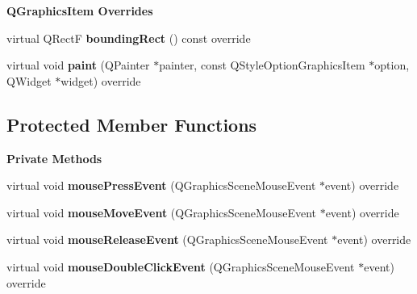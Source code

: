 \begin{Indent}\textbf{ Q\+Graphics\+Item Overrides}\par
\begin{DoxyCompactItemize}
\item 
\mbox{\label{classrev_1_1_view_1_1_timeline_track_abbdcd942dac9cec5897f6cd816451ede}} 
virtual Q\+RectF {\bfseries bounding\+Rect} () const override
\item 
\mbox{\label{classrev_1_1_view_1_1_timeline_track_a713dfe8e7dcf771a002fe1fbb7d7c5e9}} 
virtual void {\bfseries paint} (Q\+Painter $\ast$painter, const Q\+Style\+Option\+Graphics\+Item $\ast$option, Q\+Widget $\ast$widget) override
\end{DoxyCompactItemize}
\end{Indent}
\subsection*{Protected Member Functions}
\begin{Indent}\textbf{ Private Methods}\par
\begin{DoxyCompactItemize}
\item 
\mbox{\label{classrev_1_1_view_1_1_timeline_track_af54db21fd77c405a6159c8545b935879}} 
virtual void {\bfseries mouse\+Press\+Event} (Q\+Graphics\+Scene\+Mouse\+Event $\ast$event) override
\item 
\mbox{\label{classrev_1_1_view_1_1_timeline_track_a0ebd39a8f3bacaf492f4978343ab261b}} 
virtual void {\bfseries mouse\+Move\+Event} (Q\+Graphics\+Scene\+Mouse\+Event $\ast$event) override
\item 
\mbox{\label{classrev_1_1_view_1_1_timeline_track_a0ba9c0434d1bbfc8d953614698b57387}} 
virtual void {\bfseries mouse\+Release\+Event} (Q\+Graphics\+Scene\+Mouse\+Event $\ast$event) override
\item 
\mbox{\label{classrev_1_1_view_1_1_timeline_track_aee7ef43b10adf1a44b5ca1316359ffe9}} 
virtual void {\bfseries mouse\+Double\+Click\+Event} (Q\+Graphics\+Scene\+Mouse\+Event $\ast$event) override
\end{DoxyCompactItemize}
\end{Indent}
